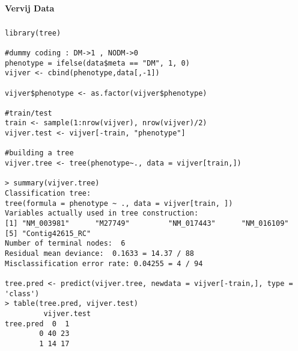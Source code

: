\documentclass[11pt]{article}
\begin{document}
\paragraph{Vervij Data}
\subparagraph{}
\begin{lstlisting}
library(tree)

#dummy coding : DM->1 , NODM->0
phenotype = ifelse(data$meta == "DM", 1, 0)
vijver <- cbind(phenotype,data[,-1])

vijver$phenotype <- as.factor(vijver$phenotype)

#train/test
train <- sample(1:nrow(vijver), nrow(vijver)/2)
vijver.test <- vijver[-train, "phenotype"]

#building a tree
vijver.tree <- tree(phenotype~., data = vijver[train,])

> summary(vijver.tree)
Classification tree:
tree(formula = phenotype ~ ., data = vijver[train, ])
Variables actually used in tree construction:
[1] "NM_003981"      "M27749"         "NM_017443"      "NM_016109"     
[5] "Contig42615_RC"
Number of terminal nodes:  6 
Residual mean deviance:  0.1633 = 14.37 / 88 
Misclassification error rate: 0.04255 = 4 / 94 

tree.pred <- predict(vijver.tree, newdata = vijver[-train,], type = 'class')
> table(tree.pred, vijver.test)
         vijver.test
tree.pred  0  1
        0 40 23
        1 14 17
\end{lstlisting}

\begin{figure}[H]
\centering

\label{}
\end{figure}

\begin{lstlisting}

\end{lstlisting}
\end{document}
